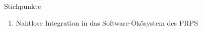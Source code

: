Stichpunkte
\begin{enumerate}
\item Nahtlose Integration in das Software-Ökösystem des PRPS
\

\end{enumerate}